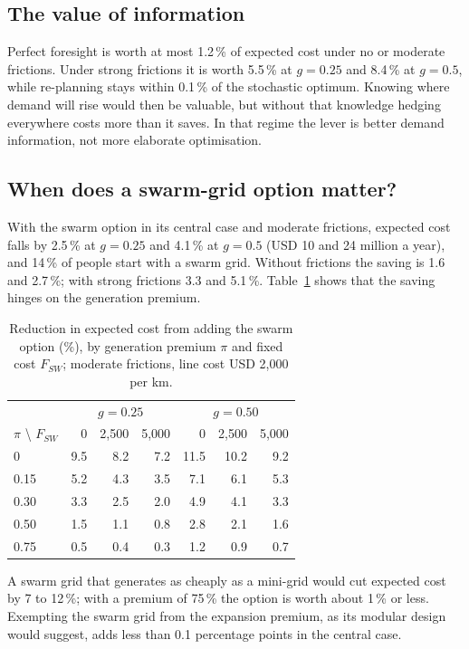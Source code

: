 \documentclass[11pt,a4paper]{article}
\begin{document}
\subsection{The value of information}
Perfect foresight is worth at most 1.2\,\% of expected cost under no or moderate frictions. Under strong frictions
it is worth 5.5\,\% at $g=0.25$ and 8.4\,\% at $g=0.5$, while re-planning stays within 0.1\,\% of the stochastic
optimum. Knowing where demand will rise would then be valuable, but without that knowledge hedging everywhere
costs more than it saves. In that regime the lever is better demand information, not more elaborate optimisation.

\subsection{When does a swarm-grid option matter?}
With the swarm option in its central case and moderate frictions, expected cost falls by 2.5\,\% at $g=0.25$ and
4.1\,\% at $g=0.5$ (USD 10 and 24 million a year), and 14\,\% of people start with a swarm grid. Without frictions the
saving is 1.6 and 2.7\,\%; with strong frictions 3.3 and 5.1\,\%. Table~\ref{tab:swarm} shows that the saving
hinges on the generation premium.

\begin{table}[!ht]\centering\small
\caption{Reduction in expected cost from adding the swarm option (\%), by generation premium $\pi$ and fixed cost
$F_{SW}$; moderate frictions, line cost USD 2,000 per km.}\label{tab:swarm}
\begin{tabular}{lrrrrrr}\toprule
 & \multicolumn{3}{c}{$g=0.25$} & \multicolumn{3}{c}{$g=0.50$}\\
$\pi$ \textbackslash{} $F_{SW}$ & 0 & 2,500 & 5,000 & 0 & 2,500 & 5,000\\\midrule
0 & 9.5 & 8.2 & 7.2 & 11.5 & 10.2 & 9.2\\
0.15 & 5.2 & 4.3 & 3.5 & 7.1 & 6.1 & 5.3\\
0.30 & 3.3 & 2.5 & 2.0 & 4.9 & 4.1 & 3.3\\
0.50 & 1.5 & 1.1 & 0.8 & 2.8 & 2.1 & 1.6\\
0.75 & 0.5 & 0.4 & 0.3 & 1.2 & 0.9 & 0.7\\\bottomrule
\end{tabular}
\end{table}
A swarm grid that generates as cheaply as a mini-grid would cut expected cost by 7 to 12\,\%; with a premium of
75\,\% the option is worth about 1\,\% or less. Exempting the swarm grid from the expansion premium, as its modular
design would suggest, adds less than 0.1 percentage points in the central case.
\end{document}
